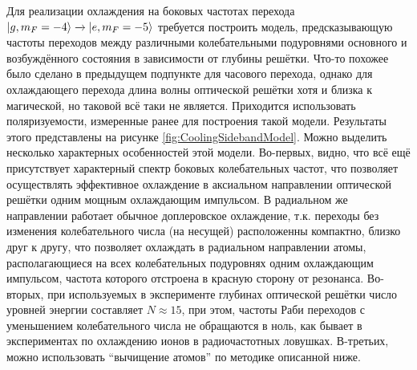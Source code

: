 Для реализации охлаждения на боковых частотах перехода $\ket{g, m_F = -4} \xrightarrow{} \ket{e, m_F = -5}$ требуется построить модель, предсказывающую частоты переходов между различными колебательными подуровнями основного и возбуждённого состояния в зависимости от глубины решётки. 
Что-то похожее было сделано в предыдущем подпункте для часового перехода, однако для охлаждающего перехода длина волны оптической решётки хотя и близка к магической, но таковой всё таки не является. 
Приходится использовать поляризуемости, измеренные ранее для построения такой модели.
Результаты этого представлены на рисунке \ref{fig:CoolingSidebandModel}.
Можно выделить несколько характерных особенностей этой модели.
Во-первых, видно, что всё ещё присутствует характерный спектр боковых колебательных частот, что позволяет осуществлять эффективное охлаждение в аксиальном направлении оптической решётки одним мощным охлаждающим импульсом. 
В радиальном же направлении работает обычное доплеровское охлаждение, т.к. переходы без изменения колебательного числа (на несущей) расположенны компактно, близко друг к другу, что позволяет охлаждать в радиальном направлении атомы, располагающиеся на всех колебательных подуровнях одним  охлаждающим импульсом, частота которого отстроена в красную сторону от резонанса.
Во-вторых, при используемых в эксперименте глубинах оптической решётки число уровней энергии составляет $N \approx 15$, при этом, частоты Раби переходов с уменьшением колебательного числа не обращаются в ноль, как бывает в экспериментах по охлаждению ионов в радиочастотных ловушках.
В-третьих, можно использовать ``вычищение атомов'' по методике описанной ниже. 

